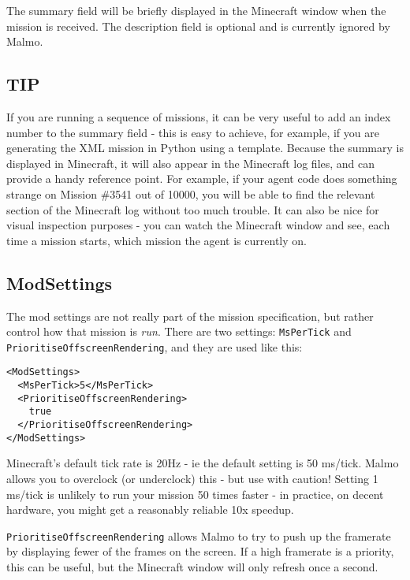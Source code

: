 \documentclass[11pt]{article} %
\begin{document}
The summary field will be briefly displayed in the Minecraft window when the mission is received. The description field is optional and is currently ignored by Malmo.

\begin{mdframed}[style=tipFrame]
\subsection*{TIP}
If you are running a sequence of missions, it can be very useful to add an index number to the summary field - this is easy to achieve, for example, if you are generating the XML mission in Python using a template. Because the summary is displayed in Minecraft, it will also appear in the Minecraft log files, and can provide a handy reference point. For example, if your agent code does something strange on Mission \#3541 out of 10000, you will be able to find the relevant section of the Minecraft log without too much trouble. It can also be nice for visual inspection purposes - you can watch the Minecraft window and see, each time a mission starts, which mission the agent is currently on.
\end{mdframed}

\subsection{ModSettings}

The mod settings are not really part of the mission specification, but rather control how that mission is \emph{run}. There are two settings: \lstinline!MsPerTick! and \lstinline!PrioritiseOffscreenRendering!, and they are used like this:

\begin{lstlisting}[frame=lines]
<ModSettings>
  <MsPerTick>5</MsPerTick>
  <PrioritiseOffscreenRendering>
    true
  </PrioritiseOffscreenRendering>
</ModSettings>
\end{lstlisting}

Minecraft's default tick rate is 20Hz - ie the default setting is 50 ms/tick. Malmo allows you to overclock (or underclock) this - but use with caution! Setting 1 ms/tick is unlikely to run your mission 50 times faster - in practice, on decent hardware, you might get a reasonably reliable 10x speedup.

\lstinline!PrioritiseOffscreenRendering! allows Malmo to try to push up the framerate by displaying fewer of the frames on the screen. If a high framerate is a priority, this can be useful, but the Minecraft window will only refresh once a second.
\end{document}
